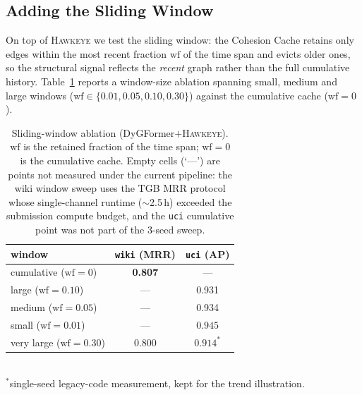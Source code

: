 \documentclass[sigconf,nonacm,review]{acmart}
\newcommand{\method}{\textsc{Hawkeye}\xspace}
\begin{document}
\subsection{Adding the Sliding Window}
On top of \method we test the sliding window: the Cohesion Cache retains only
edges within the most recent fraction $\mathrm{wf}$ of the time span and evicts
older ones, so the structural signal reflects the \emph{recent} graph rather
than the full cumulative history. Table~\ref{tab:window} reports a window-size
ablation spanning small, medium and large windows
($\mathrm{wf}\in\{0.01,0.05,0.10,0.30\}$) against the cumulative cache
($\mathrm{wf}=0$).

\begin{table}[t]
\caption{Sliding-window ablation (DyGFormer$+$\method). $\mathrm{wf}$ is the
retained fraction of the time span; $\mathrm{wf}=0$ is the cumulative cache.
Empty cells (`---') are points not measured under the current pipeline:
the wiki window sweep uses the TGB MRR protocol whose single-channel
runtime ($\sim$2.5\,h) exceeded the submission compute budget, and the
\texttt{uci} cumulative point was not part of the 3-seed sweep.}
\label{tab:window}
\centering\small
\setlength{\tabcolsep}{5pt}
\begin{tabular}{lcc}
\toprule
window & \texttt{wiki} (MRR) & \texttt{uci} (AP) \\
\midrule
cumulative ($\mathrm{wf}=0$)      & \textbf{0.807} & --- \\
large ($\mathrm{wf}=0.10$)        & ---  & 0.931 \\
medium ($\mathrm{wf}=0.05$)       & ---  & 0.934 \\
small ($\mathrm{wf}=0.01$)        & ---  & $\mathbf{0.945}$ \\
very large ($\mathrm{wf}=0.30$)   & 0.800 & $0.914^{\ast}$ \\
\bottomrule
\end{tabular}
\\[2pt]
{\footnotesize $^{\ast}$single-seed legacy-code measurement, kept for
the trend illustration.}
\end{table}
\end{document}
